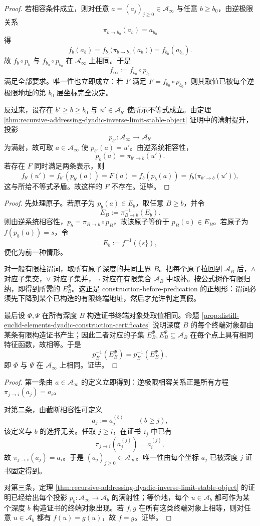 \begin{proof}
若相容条件成立，则对任意 \(a=(a_j)_{j\ge0}\in\mathcal A_\infty\) 与任意 \(b\ge b_0\)，由逆极限关系
\[
\pi_{b\to b_0}(a_b)=a_{b_0}
\]
得
\[
f_b(a_b)=f_{b_0}\bigl(\pi_{b\to b_0}(a_b)\bigr)=f_{b_0}(a_{b_0}).
\]
故 \(f_b\circ p_b\) 与 \(f_{b_0}\circ p_{b_0}\) 在 \(\mathcal A_\infty\) 上相同。于是
\[
f_\infty:=f_{b_0}\circ p_{b_0}
\]
满足全部要求。唯一性也立即成立：若 \(F\) 满足 \(F=f_{b_0}\circ p_{b_0}\)，则其取值已被每个逆极限地址的第 \(b_0\) 层坐标完全决定。

反过来，设存在 \(b'\ge b\ge b_0\) 与 \(u'\in\mathcal A_{b'}\) 使所示不等式成立。由定理 \ref{thm:recursive-addressing-dyadic-inverse-limit-stable-object} 证明中的满射提升，投影
\[
p_{b'}:\mathcal A_\infty\to\mathcal A_{b'}
\]
为满射，故可取 \(a\in\mathcal A_\infty\) 使 \(p_{b'}(a)=u'\)。由逆系统相容性，
\[
p_b(a)=\pi_{b'\to b}(u').
\]
若存在 \(F\) 同时满足两条表示，则
\[
f_{b'}(u')=f_{b'}(p_{b'}(a))=F(a)=f_b(p_b(a))=f_b\bigl(\pi_{b'\to b}(u')\bigr),
\]
这与所给不等式矛盾。故这样的 \(F\) 不存在。证毕。
\end{proof}

\begin{proof}
先处理原子。若原子为 \(p_b(a)\in E_b\)，取任意 \(B\ge b\)，并令
\[
E_B:=\pi_{B\to b}^{-1}(E_b).
\]
则由逆系统相容性，\(p_b=\pi_{B\to b}\circ p_B\)，故该原子等价于 \(p_B(a)\in E_B\)。若原子为 \(f(p_b(a))=s\)，令
\[
E_b:=f^{-1}(\{s\}),
\]
便化为前一种情形。

对一般有限柱谓词，取所有原子深度的共同上界 \(B\)。把每个原子拉回到 \(\mathcal A_B\) 后，\(\wedge\) 对应子集交，\(\vee\) 对应子集并，\(\neg\) 对应在有限集合 \(\mathcal A_B\) 中取补。按公式树作有限归纳，即得到所需的 \(E_B^\Phi\)。这正是 construction-before-predication 的正规形：谓词必须先下降到某个已构造的有限终端地址，然后才允许判定真假。

最后设 \(\Phi,\Psi\) 在所有深度 \(B\) 构造证书终端对象处取值相同。命题 \ref{prop:distill-euclid-elements-dyadic-construction-certificates} 说明深度 \(B\) 的每个终端对象都由某条有限构造证书产生；因此二者对应的子集 \(E_B^\Phi,E_B^\Psi\subseteq\mathcal A_B\) 在每个点上具有相同特征函数，故相等。于是
\[
p_B^{-1}(E_B^\Phi)=p_B^{-1}(E_B^\Psi),
\]
即 \(\Phi\) 与 \(\Psi\) 在 \(\mathcal A_\infty\) 上相同。证毕。
\end{proof}

\begin{proof}
第一条由 \(a\in\mathcal A_\infty\) 的定义立即得到：逆极限相容关系正是所有方程 \(\pi_{j\to i}(a_j)=a_i\)。

对第二条，由截断相容性可定义
\[
a_j:=a^{(b)}_j\qquad(b\ge j),
\]
该定义与 \(b\) 的选择无关。任取 \(j\ge i\)，在证书 \(\mathfrak c_j\) 中已有
\[
\pi_{j\to i}(a^{(j)}_j)=a^{(j)}_i,
\]
故 \(\pi_{j\to i}(a_j)=a_i\)。于是 \((a_j)_{j\ge0}\in\mathcal A_\infty\)。唯一性由每个坐标 \(a_j\) 已被深度 \(j\) 证书固定得到。

对第三条，定理 \ref{thm:recursive-addressing-dyadic-inverse-limit-stable-object} 的证明已经给出每个投影 \(p_b:\mathcal A_\infty\to\mathcal A_b\) 的满射性；等价地，每个 \(u\in\mathcal A_b\) 都可作为某个深度 \(b\) 构造证书的终端对象出现。若 \(f,g\) 在所有这类终端对象上相等，则对任意 \(u\in\mathcal A_b\) 都有 \(f(u)=g(u)\)，故 \(f=g\)。证毕。
\end{proof}

